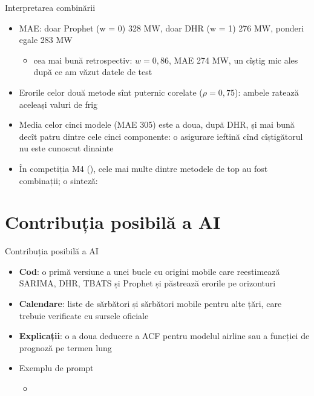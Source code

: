 \begin{frame}{Interpretarea combinării}
\itemsize{\footnotesize}
\begin{itemize}
    \item MAE: doar Prophet (w = 0) 328 MW, doar DHR (w = 1) 276 MW, ponderi egale 283 MW
    \begin{itemize}
        \item cea mai bună retrospectiv: $w = 0{,}86$, MAE 274 MW, un cîștig mic ales după ce am văzut datele de test
    \end{itemize}
    \item Erorile celor două metode sînt puternic corelate ($\rho = 0{,}75$): ambele ratează aceleași valuri de frig
    \item Media celor cinci modele (MAE 305) este a doua, după DHR, și mai bună decît patru dintre cele cinci componente: o asigurare ieftină cînd cîștigătorul nu este cunoscut dinainte
    \item În competiția M4 (), cele mai multe dintre metodele de top au fost combinații; o sinteză: 
\end{itemize}
\end{frame}


\section{Contribuția posibilă a AI}

\begin{frame}{Contribuția posibilă a AI}
\itemsize{\small}
\begin{itemize}
    \item \textbf{Cod}: o primă versiune a unei bucle cu origini mobile care reestimează SARIMA, DHR, TBATS și Prophet și păstrează erorile pe orizonturi
    \item \textbf{Calendare}: liste de sărbători și sărbători mobile pentru alte țări, care trebuie verificate cu sursele oficiale
    \item \textbf{Explicații}: o a doua deducere a ACF pentru modelul airline sau a funcției de prognoză pe termen lung
    \item Exemplu de prompt
    \begin{itemize}
        \item {}
    \end{itemize}
\end{itemize}
\end{frame}


